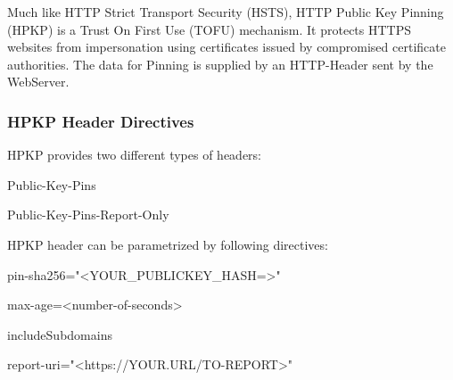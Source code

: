 Much like HTTP Strict Transport Security (HSTS), HTTP Public Key Pinning (HPKP) is a Trust On First Use (TOFU) mechanism. It protects HTTPS websites from impersonation using certificates issued by compromised certificate authorities. The data for Pinning is supplied by an HTTP-Header sent by the WebServer. 

\subsubsection{HPKP Header Directives}
\label{subsubsection:HPKP Header Directives}
HPKP provides two different types of headers:
\begin{itemize*}
  \item Public-Key-Pins
	\item Public-Key-Pins-Report-Only
\end{itemize*}
HPKP header can be parametrized by following directives:
\begin{itemize*}
  \item pin-sha256="<YOUR\_PUBLICKEY\_HASH=>"
  \item max-age=<number-of-seconds> 
	\item includeSubdomains 
	\item report-uri="<https://YOUR.URL/TO-REPORT>"
\end{itemize*}

